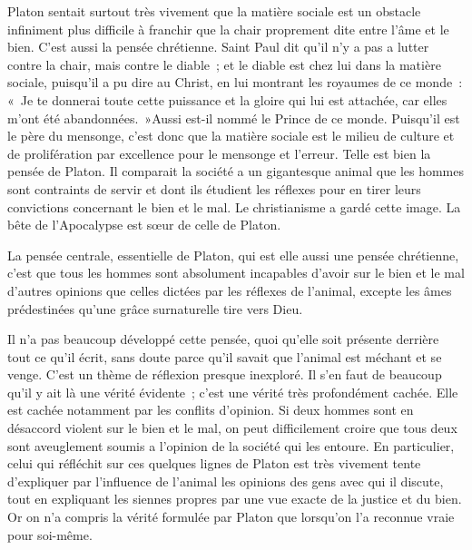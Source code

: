 \documentclass[french,twoside]{book} %
\begin{document}
Platon sentait surtout très vivement que la matière sociale est un obstacle infiniment plus difficile à franchir que la chair proprement dite entre l'âme et le bien. C'est aussi la pensée chrétienne. Saint Paul dit qu'il n'y a pas a lutter contre la chair, mais contre le diable ; et le diable est chez lui dans la matière sociale, puisqu'il a pu dire au Christ, en lui montrant les royaumes de ce monde : « Je te donnerai toute cette puissance et la gloire qui lui est attachée, car elles m'ont été abandonnées. »Aussi est-il nommé le Prince de ce monde. Puisqu'il est le père du mensonge, c'est donc que la matière sociale est le milieu de culture et de prolifération par excellence pour le mensonge et l'erreur. Telle est bien la pensée de Platon. Il comparait la société a un gigantesque animal que les hommes sont contraints de servir et dont ils étudient les réflexes pour en tirer leurs convictions concernant le bien et le mal. Le christianisme a gardé cette image. La bête de l'Apocalypse est sœur de celle de Platon.\par
La pensée centrale, essentielle de Platon, qui est elle aussi une pensée chrétienne, c'est que tous les hommes sont absolument incapables d'avoir sur le bien et le mal d'autres opinions que celles dictées par les réflexes de l'animal, excepte les âmes prédestinées qu'une grâce surnaturelle tire vers Dieu.\par
Il n'a pas beaucoup développé cette pensée, quoi qu'elle soit présente derrière tout ce qu'il écrit, sans doute parce qu'il savait que l'animal est méchant et se venge. C'est un thème de réflexion presque inexploré. Il s'en faut de beaucoup qu'il y ait là une vérité évidente ; c'est une vérité très profondément cachée. Elle est cachée notamment par les conflits d'opinion. Si deux hommes sont en désaccord violent sur le bien et le mal, on peut difficilement croire que tous deux sont aveuglement soumis a l'opinion de la société qui les entoure. En particulier, celui qui réfléchit sur ces quelques lignes de Platon est très vivement tente d'expliquer par l'influence de l'animal les opinions des gens avec qui il discute, tout en expliquant les siennes propres par une vue exacte de la justice et du bien. Or on n'a compris la vérité formulée par Platon que lorsqu'on l'a reconnue vraie pour soi-même.\par
\end{document}
